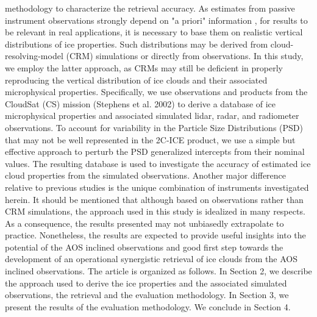 \documentclass{ametsocV6.1}
\begin{document}
methodology to characterize the retrieval accuracy. As estimates from passive instrument 
observations strongly depend on "a priori" information \citep{rodgers2000inverse}, for results to be 
relevant in real applications, it is necessary to base them on realistic vertical distributions of 
ice properties.  Such distributions may be derived from cloud-resolving-model (CRM) simulations 
\citep{pfreundschuh2020synergistic,liu2022assessing} or directly from observations.  In this study, we employ the latter 
approach, as CRMs may still be deficient in properly reproducing the vertical distribution of ice 
clouds and their associated microphysical properties.  Specifically, we use observations and
products from the CloudSat (CS) mission (Stephens et al. 2002) to derive a database of ice microphysical
properties and associated simulated lidar, radar, and radiometer observations.  To account for variability in 
the Particle Size Distributions (PSD) that may not be well represented in the 2C-ICE product, we use a simple
but effective approach to perturb the PSD generalized intercepts from their nominal values.
The resulting database is used to
investigate the accuracy of estimated ice cloud properties from the simulated observations. Another major
difference relative to previous studies is the unique combination of instruments investigated herein. It should be
mentioned that although based on observations rather than CRM simulations, the approach used in this study is
idealized in many respects. As a consequence, the results presented may not unbiasedly extrapolate to practice.
Nonetheless, the results are expected to provide useful insights into the potential of the AOS inclined observations and
good first step towards the development of an operational synergistic retrieval of ice clouds from the AOS inclined observations.
The article is organized as follows.  In Section 2, we describe the approach used to derive the ice properties and
the associated simulated observations, the retrieval and the evaluation methodology.  In Section 3, we 
present the results of the evaluation methodology. We conclude in Section 4.

\end{document}

